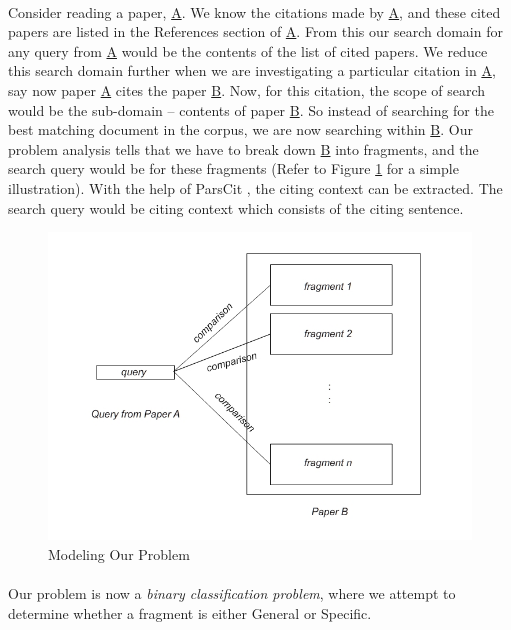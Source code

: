\paragraph{}
Consider reading a paper, \url{A}. We know the citations made by \url{A}, and these cited papers are listed in the References section of \url{A}. From this our search domain for any query from \url{A} would be the contents of the list of cited papers. We reduce this search domain further when we are investigating a particular citation in \url{A}, say now paper \url{A} cites the paper \url{B}. Now, for this citation, the scope of search would be the sub-domain -- contents of paper \url{B}. So instead of searching for the best matching document in the corpus, we are now searching within \url{B}. Our problem analysis tells that we have to break down \url{B} into fragments, and the search query would be for these fragments (Refer to Figure \ref{fig:model} for a simple illustration). With the help of ParsCit \cite{parscit}, the citing context can be extracted. The search query would be citing context which consists of the citing sentence.

\begin{figure}[h]
  \centering
  \includegraphics[scale=0.50]{./model}
  \caption{Modeling Our Problem}
  \label{fig:model}
\end{figure}

\paragraph{}
Our problem is now a \textit{binary classification problem}, where we attempt to determine whether a fragment is either General or Specific.

